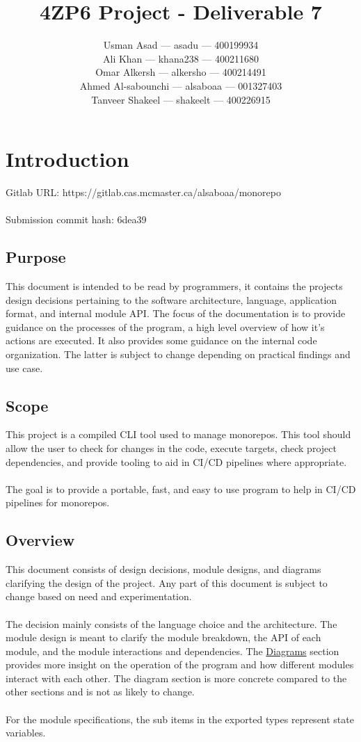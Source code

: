 \documentclass[11pt]{article}
\title{\textbf{4ZP6 Project - Deliverable 7}}
\author{Usman Asad --- asadu  --- 400199934\\
  Ali Khan --- khana238  --- 400211680\\
  Omar Alkersh --- alkersho --- 400214491 \\
  Ahmed Al-sabounchi --- alsaboaa --- 001327403 \\
  Tanveer Shakeel --- shakeelt --- 400226915}
\begin{document}
\maketitle
\tableofcontents
\newpage

\section{Introduction}
Gitlab URL: https://gitlab.cas.mcmaster.ca/alsaboaa/monorepo \\
\\
Submission commit hash: 6dea39
\subsection{Purpose}

This document is intended to be read by programmers, it contains the projects design
decisions pertaining to the software architecture, language, application format,
and internal module API. The focus of the documentation is to provide guidance on the
processes of the program, a high level overview of how it's actions are executed. It
also provides some guidance on the internal code organization. The latter is subject
to change depending on practical findings and use case.

\subsection{Scope}

This project is a compiled \Gls{CLI} tool used to manage \glspl{monorepo}. This
tool should allow the user to check for changes in the code, execute \glspl{target},
check project dependencies, and provide tooling to aid in \Gls{CI/CD} pipelines
where appropriate.
\\\\
The goal is to provide a portable, fast, and easy to use program to help in
CI/CD pipelines for \glspl{monorepo}.

\subsection{Overview}

This document consists of design decisions, module designs, and diagrams
clarifying the design of the project. Any part of this document is subject to
change based on need and experimentation.
\\\\
The decision mainly consists of the language choice and the architecture. The
module design is meant to clarify the module breakdown, the API of each module,
and the module interactions and dependencies. The
\hyperref[sec:diagrams]{Diagrams} section provides more insight on the operation
of the program and how different modules interact with each other. The diagram
section is more concrete compared to the other sections and is not as likely
to change.
\\\\
For the module specifications, the sub items in the exported types represent
state variables.
\end{document}
